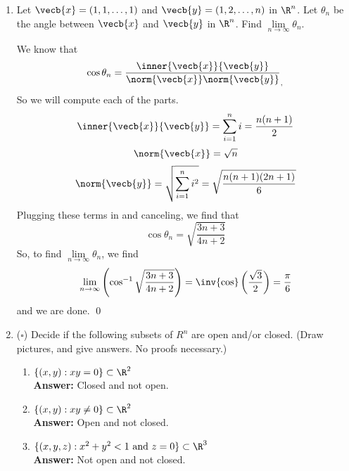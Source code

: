 \documentclass[a5paper]{article}
\theoremstyle{definition}%
\numberwithin{exercise}{section}
\theoremstyle{remark}%
\begin{document}
\begin{enumerate}
\begin{proof}($\implies$)
Suppose that $\norm{\vecb{x}+\vecb{y}}^2=\norm{\vecb{x}}^2+\norm{\vecb{y}}^2$. Then, 
\[\begin{array}{rcl}
\norm{\vecb{x}+\vecb{y}}^2&=&\norm{\vecb{x}}^2+\norm{\vecb{y}}^2\\
\norm{\vecb{x}}^2+2\inner{\vecb{x}}{\vecb{y}}+\norm{\vecb{y}}^2&=&\norm{\vecb{x}}^2+\norm{\vecb{y}}^2\\
2\inner{\vecb{x}}{\vecb{y}}&=&0\\
\end{array}\]
Thus, $\vecb{x}$ and $\vecb{y}$ are orthogonal by definition. 
\end{proof}

\item Let $\vecb{x}=(1,1,\ldots, 1)$ and $\vecb{y}=(1,2,\ldots, n)$ in $\R^n$. Let $\theta_n$ be the angle between $\vecb{x}$ and $\vecb{y}$ in $\R^n$. Find $\lim\limits_{n\to\infty}\theta_n$. 

We know that 
$$\cos\theta_n=\frac{\inner{\vecb{x}}{\vecb{y}}}{\norm{\vecb{x}}\norm{\vecb{y}}}_,$$
So we will compute each of the parts. 
$$\inner{\vecb{x}}{\vecb{y}}=\sum_{i=1}^ni=\frac{n(n+1)}{2}$$
$$\norm{\vecb{x}}=\sqrt{n}$$
$$\norm{\vecb{y}}=\sqrt{\sum_{i=1}^n i^2}=\sqrt{\frac{n(n+1)(2n+1)}{6}}$$
Plugging these terms in and canceling, we find that 
$$\cos\theta_n=\sqrt{\frac{3n+3}{4n+2}}$$
So, to find $\lim\limits_{n\to\infty}\theta_n$, we find 
$$\lim\limits_{n\to\infty}\left(\cos^{-1}\sqrt{\frac{3n+3}{4n+2}}\right)=\inv{\cos}\left(\frac{\sqrt{3}}{2}\right)=\frac{\pi}{6}$$
and we are done. \qed

\item ($\square$) Decide if the following subsets of $R^n$ are open and/or closed. (Draw pictures, and give answers. No proofs necessary.)

	\begin{enumerate}[label=(\alph*)]
	\item $\{(x,y):xy=0\}\subset\R^2$\\
	\textbf{Answer:} Closed and not open. 
	\qedwhite
	
	\item $\{(x,y):xy\neq0\}\subset\R^2$\\
	\textbf{Answer:} Open and not closed. 
	\qedwhite
	
	\item $\{(x,y,z):x^2+y^2<1 \text{ and } z=0\}\subset\R^3$\\
	\textbf{Answer:} Not open and not closed. 
	\qedwhite
	

\end{enumerate}
\end{enumerate}
\end{document}
